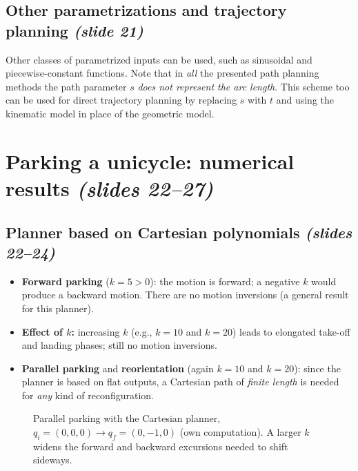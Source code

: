 \documentclass[11pt,a4paper]{article}
\def\boldsymbol#1{#1}%
\newcommand{\qi}{\boldsymbol{q}_i}
\newcommand{\qf}{\boldsymbol{q}_f}
\theoremstyle{definition}
\theoremstyle{plain}
\theoremstyle{remark}
\begin{document}
\subsection{Other parametrizations and trajectory planning \emph{(slide 21)}}

Other classes of parametrized inputs can be used, such as sinusoidal and piecewise-constant functions. Note that in
\emph{all} the presented path planning methods the path parameter $s$ \emph{does not represent the arc length}. This scheme too can
be used for direct trajectory planning by replacing $s$ with $t$ and using the kinematic model in place of the geometric model.

\section{Parking a unicycle: numerical results \emph{(slides 22--27)}}

\subsection{Planner based on Cartesian polynomials \emph{(slides 22--24)}}

\begin{itemize}
\item \textbf{Forward parking} ($k=5>0$): the motion is forward; a negative $k$ would produce a backward motion. There are no motion inversions (a general result for this planner).
\item \textbf{Effect of $k$:} increasing $k$ (e.g., $k=10$ and $k=20$) leads to elongated take-off and landing phases; still no motion inversions.
\item \textbf{Parallel parking} and \textbf{reorientation} (again $k=10$ and $k=20$): since the planner is based on flat outputs, a Cartesian path of \emph{finite length} is needed for \emph{any} kind of reconfiguration.
\end{itemize}

\begin{figure}[H]
\centering
{}
\caption{Parallel parking with the Cartesian planner, $\qi=(0,0,0)\to\qf=(0,-1,0)$ (own computation). A larger $k$ widens the
forward and backward excursions needed to shift sideways.}
\end{figure}
\end{document}
